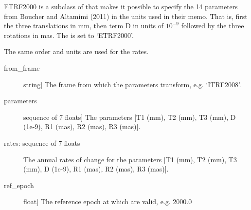 \documentclass[a4paper,10pt,english]{sphinxmanual}
\begin{document}
\begin{fulllineitems}
\end{fulllineitems}


\begin{fulllineitems}
\label{\detokenize{api-docs:etrsitrs.main.ETRF2000}}
ETRF2000 is a subclass of  that makes it
possible to specify the 14 parameters from Boucher and Altamimi
(2011) in the units used in their memo. That is, first the three
translations in mm, then term D in units of \(10^{-9}\)
followed by the three rotations in mas. The  is set to
‘ETRF2000’.

The same order and units are used for the rates.

\begin{description}
\item[{from\_frame}] \leavevmode{[}string{]}
The frame from which the parameters transform,
e.g. ‘ITRF2008’.

\item[{parameters}] \leavevmode{[}sequence of 7 floats{]}
The parameters {[}T1 (mm), T2 (mm), T3 (mm), D (1e-9), R1 (mas),
R2 (mas), R3 (mas){]}.

\item[{rates: sequence of 7 floats}] \leavevmode
The annual rates of change for the parameters {[}T1 (mm), T2
(mm), T3 (mm), D (1e-9), R1 (mas), R2 (mas), R3 (mas){]}.

\item[{ref\_epoch}] \leavevmode{[}float{]}
The reference epoch at which  are valid,
e.g. 2000.0

\end{description}



\end{fulllineitems}
\end{document}
